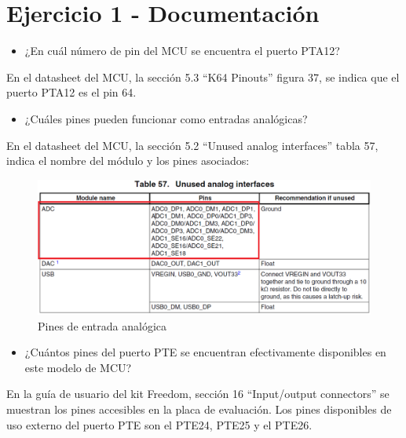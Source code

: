 \documentclass{article}
\begin{document}
\newgeometry{} %



\tableofcontents
\newpage

\section*{Ejercicio 1 - Documentación}

\begin{itemize}
\item ¿En cuál número de pin del MCU se encuentra el puerto PTA12?
\end{itemize}
En el datasheet del MCU, la sección 5.3 ``K64 Pinouts'' figura 37, se indica que el puerto PTA12 es el pin 64.

\begin{itemize}
\item ¿Cuáles pines pueden funcionar como entradas analógicas?
\end{itemize}
En el datasheet del MCU, la sección 5.2 ``Unused analog interfaces'' tabla 57, indica el nombre del módulo y los pines asociados:

\begin{figure}[ht]
	\centering
	\includegraphics[width=0.8 \textwidth]
	{../Imagenes/TablaADC.png}
	\caption{Pines de entrada analógica}
	\label{fig:ej1}
\end{figure}

\begin{itemize}
\item ¿Cuántos pines del puerto PTE se encuentran efectivamente disponibles en este modelo de MCU?
\end{itemize}
En la guía de usuario del kit Freedom, sección 16 ``Input/output connectors'' se muestran los pines accesibles en la placa de evaluación. Los pines disponibles de uso externo del puerto PTE son el PTE24, PTE25 y el PTE26.
\end{document}
